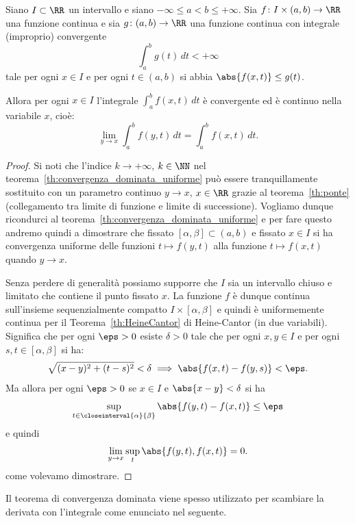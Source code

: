 \begin{theorem}
  \label{th:convergenza_dominata}%
  \mymark{**}%
Siano $I\subset \RR$ un intervallo e siano 
$-\infty \le a < b \le +\infty$.
Sia $f\colon I \times(a,b)\to \RR$ una funzione continua 
e sia $g\colon(a,b)\to \RR$ una funzione continua con integrale 
(improprio) convergente
\[
 \int_a^b g(t)\, dt < +\infty
\]
tale per ogni $x\in I$ e per ogni $t\in(a,b)$ si abbia $\abs{f(x,t)} \le g(t)$.

Allora per ogni $x\in I$ l'integrale $\int_a^b f(x,t)\, dt$ è convergente ed è continuo 
nella variabile $x$, cioè:
\[
  \lim_{y\to x} \int_a^b f(y,t)  \, dt 
  = \int_a^b f(x,t)\, dt.
\]
\end{theorem}
%
\begin{proof}
Si noti che l'indice $k\to +\infty$, $k\in \NN$ 
nel teorema~\ref{th:convergenza_dominata_uniforme} 
può essere tranquillamente sostituito con 
un parametro continuo $y\to x$, $x\in \RR$
grazie al teorema~\ref{th:ponte} (collegamento tra limite 
di funzione e limite di successione).
Vogliamo dunque ricondurci al teorema~\ref{th:convergenza_dominata_uniforme} 
e per fare questo andremo quindi a dimostrare che fissato $[\alpha,\beta]\subset (a,b)$ 
e fissato $x\in I$ si ha convergenza uniforme 
delle funzioni $t\mapsto f(y,t)$ alla funzione $t\mapsto f(x,t)$
quando $y\to x$. 

Senza perdere di generalità possiamo supporre che $I$ sia un intervallo chiuso e limitato 
che contiene il punto fissato $x$. 
La funzione $f$ è dunque continua sull'insieme sequenzialmente compatto $I\times [\alpha,\beta]$ 
e quindi è uniformemente continua
per il Teorema~\ref{th:HeineCantor} di Heine-Cantor (in due variabili).
Significa che per ogni $\eps>0$ esiste $\delta>0$ tale che per ogni $x,y\in I$ 
e per ogni $s,t\in[\alpha,\beta]$ si ha:
\[
\sqrt{(x-y)^2+(t-s)^2} < \delta \implies \abs{f(x,t)-f(y,s)} < \eps.  
\]
Ma allora per ogni $\eps>0$ se $x\in I$ e $\abs{x-y} < \delta$ si ha 
\[
  \sup_{t\in\closeinterval{\alpha}{\beta}} \abs{f(y,t)-f(x,t)} \le \eps
\]
e quindi
\[
  \lim_{y\to x}  \sup_t \abs{f(y,t), f(x,t)} = 0.
\]
come volevamo dimostrare.
\end{proof}
%
Il teorema di convergenza dominata viene spesso utilizzato 
per scambiare la derivata con l'integrale come enunciato nel seguente.
%
